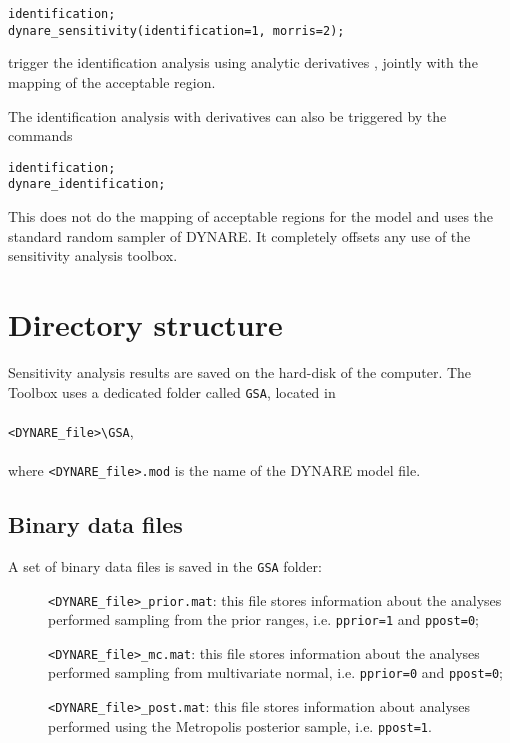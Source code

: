 \documentclass[12pt,a4paper]{article}
\begin{document}
\vspace{1cm}
\noindent\verb"identification;"\\
\verb"dynare_sensitivity(identification=1, morris=2);"

\vspace{1cm}
\noindent trigger the identification analysis using analytic derivatives \citep{Iskrev2009}, jointly with the mapping of the acceptable region.

The identification analysis with derivatives can also be triggered by the commands

\vspace{1cm}
\noindent\verb"identification;"\\
\verb"dynare_identification;"

\vspace{1cm}
This does not do the mapping of acceptable regions for the model and uses the standard random sampler of DYNARE. It completely offsets any use of the sensitivity analysis toolbox.
\newpage
\section{Directory structure}
Sensitivity analysis results are saved on the hard-disk of the
computer. The Toolbox uses a dedicated folder called \verb"GSA",
located in \\
\\
\verb"<DYNARE_file>\GSA", \\
\\
where \verb"<DYNARE_file>.mod" is the name of the DYNARE model
file.

\subsection{Binary data files}
A set of binary data files is saved in the \verb"GSA" folder:
\begin{description}
\item[]\verb"<DYNARE_file>_prior.mat": this file stores
information about the analyses performed sampling from the prior
ranges, i.e. \verb"pprior=1" and \verb"ppost=0";
\item[]\verb"<DYNARE_file>_mc.mat": this file stores
information about the analyses performed sampling from
multivariate normal, i.e. \verb"pprior=0" and \verb"ppost=0";
\item[]\verb"<DYNARE_file>_post.mat": this file stores information
about analyses performed using the Metropolis posterior sample,
i.e. \verb"ppost=1".
\end{description}
\end{document}
